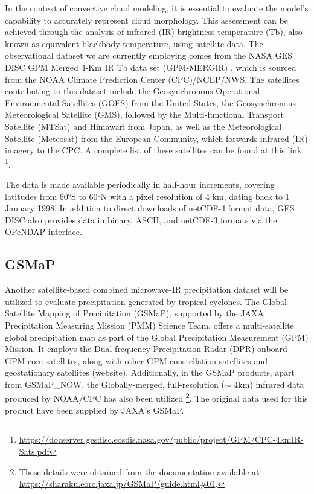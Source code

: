 In the context of convective cloud modeling, it is essential to evaluate the model's capability to accurately represent cloud morphology. This assessment can be achieved through the analysis of infrared (IR) brightness temperature (Tb), also known as equivalent blackbody temperature, using satellite data. The observational dataset we are currently employing comes from the NASA GES DISC GPM Merged 4-Km IR Tb data set (GPM-MERGIR) \cite{janowiak2017ncep}, which is sourced from the NOAA Climate Prediction Center (CPC)/NCEP/NWS. The satellites contributing to this dataset include the Geosynchronous Operational Environmental Satellites (GOES) from the United States, the Geosynchronous Meteorological Satellite (GMS), followed by the Multi-functional Transport Satellite (MTSat) and Himawari from Japan, as well as the Meteorological Satellite (Meteosat) from the European Community, which forwards infrared (IR) imagery to the CPC. A complete list of these satellites can be found at this link \footnote{\url{https://docserver.gesdisc.eosdis.nasa.gov/public/project/GPM/CPC-4kmIR-Sats.pdf}}.

The data is made available periodically in half-hour increments, covering latitudes from 60°S to 60°N with a pixel resolution of 4 km, dating back to 1 January 1998. In addition to direct downloads of netCDF-4 format data, GES DISC also provides data in binary, ASCII, and netCDF-3 formats via the OPeNDAP interface.

\subsection{GSMaP}
\label{section315}

Another satellite-based combined microwave-IR precipitation dataset will be utilized to evaluate precipitation generated by tropical cyclones. The Global Satellite Mapping of Precipitation (GSMaP), supported by the JAXA Precipitation Measuring Mission (PMM) Science Team, offers a multi-satellite global precipitation map as part of the Global Precipitation Measurement (GPM) Mission. It employs the Dual-frequency Precipitation Radar (DPR) onboard GPM core satellites, along with other GPM constellation satellites and geostationary satellites (website). Additionally, in the GSMaP products, apart from GSMaP\_NOW, the Globally-merged, full-resolution ($\sim$ 4km) infrared data produced by NOAA/CPC has also been utilized \footnote{These details were obtained from the documentation available at \url{https://sharaku.eorc.jaxa.jp/GSMaP/guide.html\#01}.}.
The original data used for this product have been supplied by JAXA’s GSMaP.

